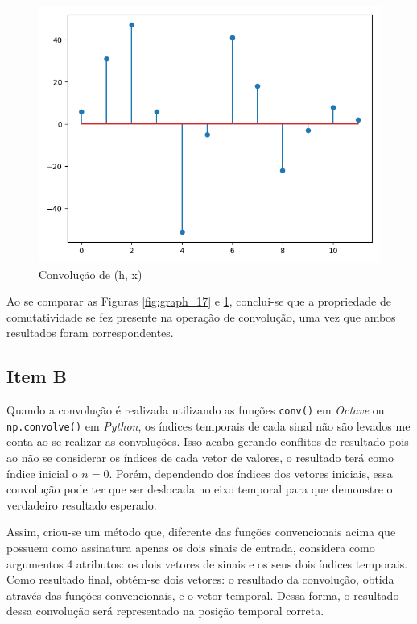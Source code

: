 \begin{figure}[!htb]
    \centering
    \includegraphics[width=\linewidth]{Imagens/fig18.png}
    \caption{Convolução de (h, x)}
    \label{fig:graph_18}
\end{figure}

Ao se comparar as Figuras \ref{fig:graph_17} e \ref{fig:graph_18}, conclui-se que a propriedade de comutatividade se fez presente na operação de convolução, uma vez que ambos resultados foram correspondentes.

\subsection{Item B}

Quando a convolução é realizada utilizando as funções \texttt{conv()} em \textit{Octave} ou \texttt{np.convolve()}
 em \textit{Python}, os índices temporais de cada sinal não são levados me conta ao se realizar as convoluções. Isso acaba gerando conflitos de resultado pois ao não se considerar os índices de cada vetor de valores, o resultado terá como índice inicial o $n = 0$. Porém, dependendo dos índices dos vetores iniciais, essa convolução pode ter que ser deslocada no eixo temporal para que demonstre o verdadeiro resultado esperado.

 Assim, criou-se um método que, diferente das funções convencionais acima que possuem como assinatura apenas os dois sinais de entrada, considera como argumentos 4 atributos: os dois vetores de sinais e os seus dois índices temporais. Como resultado final, obtém-se dois vetores: o resultado da convolução, obtida através das funções convencionais, e o vetor temporal. Dessa forma, o resultado dessa convolução será representado na posição temporal correta.

